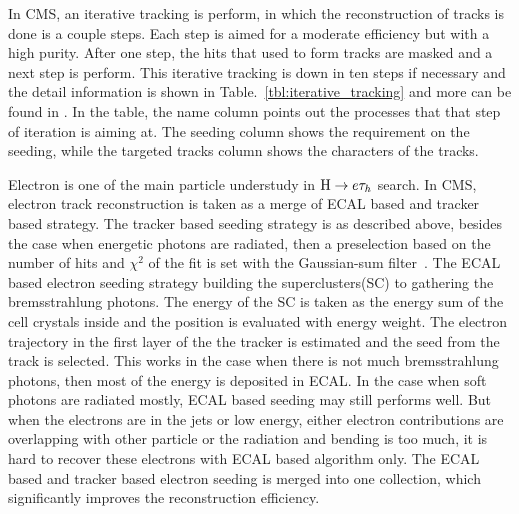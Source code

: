 In CMS, an iterative tracking is perform, in which the reconstruction of tracks is done is a couple steps. Each step is aimed for a moderate efficiency but with a high purity. After one step, the hits that used to form tracks are masked and a next step is perform. This iterative tracking is down in ten steps if necessary and the detail information is shown in Table.~\ref{tbl:iterative_tracking} and more can be found in \cite{CMS-PRF-14-001}. In the table, the name column points out the processes that that step of iteration is aiming at. The seeding column shows the requirement on the seeding, while the targeted tracks column shows the characters of the tracks.

Electron is one of the main particle understudy in $\mathrm{H} \to e \tau_{h}$ search. In CMS, electron track reconstruction is taken as a merge of ECAL based and tracker based strategy. The tracker based seeding strategy is as described above, besides the case when energetic photons are radiated, then a preselection based on the number of hits and $\chi^{2}$ of the fit is set with the Gaussian-sum filter~\cite{Algo:GSF}. The ECAL based electron seeding strategy building the superclusters(SC) to gathering the bremsstrahlung photons. The energy of the SC is taken as the energy sum of the cell crystals inside and the position is evaluated with energy weight. The electron trajectory in the first layer of the the tracker is estimated and the seed from the track is selected. This works in the case when there is not much bremsstrahlung photons, then most of the energy is deposited in ECAL. In the case when soft photons are radiated mostly, ECAL based seeding may still performs well. But when the electrons are in the jets or low energy, either electron contributions are overlapping with other particle or the radiation and bending is too much, it is hard to recover these electrons with ECAL based algorithm only. The ECAL based and tracker based electron seeding is merged into one collection, which significantly improves the reconstruction efficiency.



